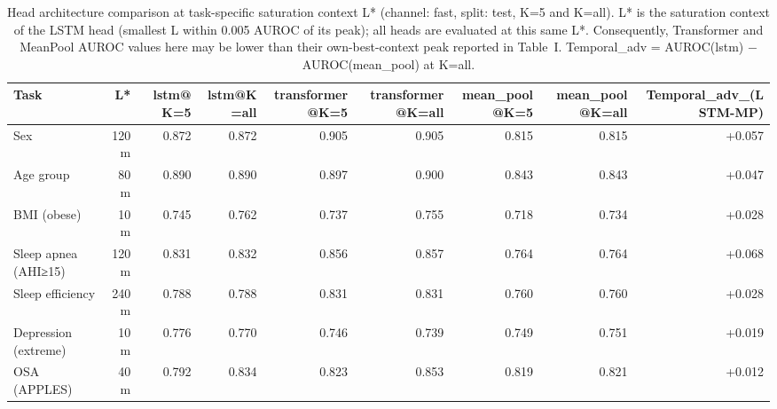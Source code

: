 \begin{table}[ht]
\centering
\caption{Head architecture comparison at task-specific saturation context L* (channel: fast, split: test, K=5 and K=all). L* is the saturation context of the LSTM head (smallest L within 0.005 AUROC of its peak); all heads are evaluated at this same L*. Consequently, Transformer and MeanPool AUROC values here may be lower than their own-best-context peak reported in Table~I. Temporal\_adv = AUROC(lstm) $-$ AUROC(mean\_pool) at K=all.}
\label{tab:heads_fast}
\begin{tabular}{lrrrrrrrr}
\toprule
Task & L* & lstm@K=5 & lstm@K=all & transformer@K=5 & transformer@K=all & mean_pool@K=5 & mean_pool@K=all & Temporal_adv_(LSTM-MP) \\
\midrule
Sex & 120m & 0.872 & 0.872 & 0.905 & 0.905 & 0.815 & 0.815 & +0.057 \\
Age group & 80m & 0.890 & 0.890 & 0.897 & 0.900 & 0.843 & 0.843 & +0.047 \\
BMI (obese) & 10m & 0.745 & 0.762 & 0.737 & 0.755 & 0.718 & 0.734 & +0.028 \\
Sleep apnea (AHI≥15) & 120m & 0.831 & 0.832 & 0.856 & 0.857 & 0.764 & 0.764 & +0.068 \\
Sleep efficiency & 240m & 0.788 & 0.788 & 0.831 & 0.831 & 0.760 & 0.760 & +0.028 \\
Depression (extreme) & 10m & 0.776 & 0.770 & 0.746 & 0.739 & 0.749 & 0.751 & +0.019 \\
OSA (APPLES) & 40m & 0.792 & 0.834 & 0.823 & 0.853 & 0.819 & 0.821 & +0.012 \\
\bottomrule
\end{tabular}
\end{table}